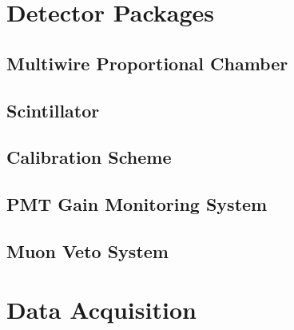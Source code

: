 \section{Detector Packages}
\subsection{Multiwire Proportional Chamber}

\subsection{Scintillator}

\subsection{Calibration Scheme}

\subsection{PMT Gain Monitoring System}

\subsection{Muon Veto System}

\section{Data Acquisition}











